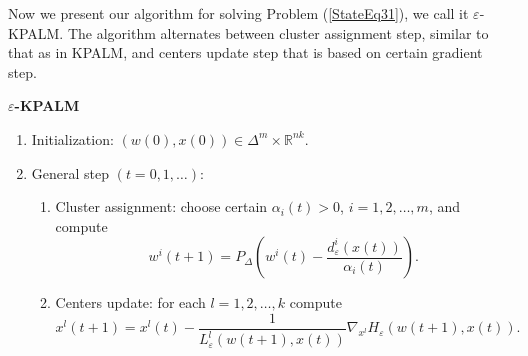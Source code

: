\documentclass[11pt]{article}
\numberwithin{equation}{section}
\begin{document}

Now we present our algorithm for solving Problem (\ref{StateEq31}), we call it $\varepsilon$-KPALM.  The algorithm alternates between cluster assignment step, similar to that as in KPALM, and centers update step that is based on certain gradient step.

\begin{framed}
\noindent \textbf{$\varepsilon$-KPALM}
\begin{enumerate}[(1)]
	\item Initialization: $(w(0),x(0)) \in \Delta^m \times \mathbb{R}^{nk} .$
	\item General step $\left( t=0,1, \ldots \right)$:
	\begin{enumerate}[(2.1)]
		\item Cluster assignment: choose certain $\alpha_i(t) > 0$, $i=1,2, \ldots, m$, and compute
		\begin{equation}
			w^i(t+1) = P_{\Delta} \left(w^i(t) - \frac{d_{\varepsilon}^i(x(t))}{\alpha_i(t)}\right) . \label{StateEq32}
		\end{equation}
		\item Centers update: for each $l=1, 2, \ldots ,k$ compute
		\begin{equation}
			x^l(t+1) = x^l(t) - \frac{1}{L^l_{\varepsilon}(w(t+1), x(t))}\nabla_{x^l} H_{\varepsilon}(w(t+1), x(t)) . \label{StateEq33}
		\end{equation}
	\end{enumerate}
\end{enumerate}
\end{framed}
\end{document}
